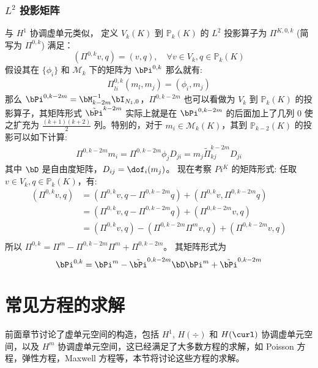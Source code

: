 \subsubsection{$L^2$ 投影矩阵}
与 $H^1$ 协调虚单元类似，
定义 $V_k(K)$ 到 $\mathbb{P}_{k}(K)$ 的 $L^2$ 投影算子为 $\Pi^{K, 0, k}$ (简写为
$\Pi^{0, k}$) 满足：
$$
(\Pi^{0, k}v, q) = (v, q), \quad \forall v \in V_k, q \in \mathbb{P}_k(K)
$$
假设其在 $\{\phi_i\}$ 和 $\mathcal{M}_k$ 下的矩阵为 $\bPi^{0, k}$ 那么就有:
\begin{align}
\label{eq:proj2}
\Pi_{li}^{0, k}(m_l, m_j) = (\phi_i, m_j)
\end{align}
那么 $\bPi^{0, k-2m} = \bM^{-1}_{k-2m}\bI_{N_1, 0}$，$\Pi^{0, k-2m}$ 也可以看做为
$V_{k}$ 到 $\mathbb{P}_{k}(K)$ 的投影算子，其矩阵形式 
$\tilde{\bPi}^{k-2m}$ 实际上就是在 $\bPi^{0, k-2m}$ 的后面加上了几列 0 使之扩充为
$\frac{(k+1)(k+2)}{2}$ 列。特别的，对于 $m_i \in \mathcal{M}_k(K)$，其到
$\mathbb{P}_{k-2}(K)$ 的投影可以如下计算:
\begin{align}
\label{eq:proj3} 
\Pi^{0, k-2m} m_i = \Pi^{0, k-2m} \phi_j D_{ji} = m_j \tilde{\Pi}^{k-2m}_{kj}D_{ji}
\end{align}
其中 $\bD$ 是自由度矩阵，$D_{ij} = \dof_i(m_j)$。
现在考察 $Pi^{K}$ 的矩阵形式: 任取 $v \in V_k, q \in \mathbb{P}_k(K)$，有:
$$
\begin{aligned}
    (\Pi^{0, k} v, q) & = (\Pi^{0, k} v, q-\Pi^{0, k-2m} q) + 
    (\Pi^{0, k} v, \Pi^{0, k-2m} q)\\
    & = (\Pi^{0, k} v, q-\Pi^{0, k-2m} q) + (\Pi^{0, k-2m} v, q)\\
    & = (\Pi^{0, k} v, q) - (\Pi^{0, k-2m} \Pi^m v, q) + (\Pi^{0, k-2m} v, q)\\
\end{aligned}
$$
所以 $\Pi^{0, k} = \Pi^{m} - \Pi^{0, k-2m}\Pi^{m} + \Pi^{0,
k-2m}$。
其矩阵形式为 
$$
\bPi^{0, k} = \bPi^{m} - \tilde{\bPi}^{0, k-2m}\bD\bPi^{m} + \tilde{\bPi}^{0, k-2m}
$$

\section{常见方程的求解}
前面章节讨论了虚单元空间的构造，包括 $H^1$, $H(\div)$ 和 $H(\curl)$
协调虚单元空间，以及 $H^m$ 协调虚单元空间，这已经满足了大多数方程的求解，如
Poisson 方程，弹性方程，Maxwell 方程等，本节将讨论这些方程的求解。
